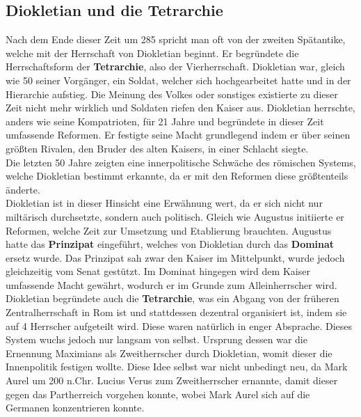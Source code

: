 \documentclass{article}
\begin{document}
	\subsection{Diokletian und die Tetrarchie}
	Nach dem Ende dieser Zeit um 285 spricht man oft von der zweiten Spätantike, welche mit der Herrschaft von Diokletian beginnt. Er begründete die Herrschaftsform der \textbf{Tetrarchie}, also der Vierherrschaft. Diokletian war, gleich wie 50 seiner Vorgänger, ein Soldat, welcher sich hochgearbeitet hatte und in der Hierarchie aufstieg. Die Meinung des Volkes oder sonstiges existierte zu dieser Zeit nicht mehr wirklich und Soldaten riefen den Kaiser aus. Diokletian herrschte, anders wie seine Kompatrioten, für 21 Jahre und begründete in dieser Zeit umfassende Reformen. Er festigte seine Macht grundlegend indem er über seinen größten Rivalen, den Bruder des alten Kaisers, in einer Schlacht siegte. \\
	Die letzten 50 Jahre zeigten eine innerpolitische Schwäche des römischen Systems, welche Diokletian bestimmt erkannte, da er mit den Reformen diese größtenteils änderte. \\
	Diokletian ist in dieser Hinsicht eine Erwähnung wert, da er sich nicht nur miltärisch durchsetzte, sondern auch politisch. Gleich wie Augustus initiierte er Reformen, welche Zeit zur Umsetzung und Etablierung brauchten. Augustus hatte das \textbf{Prinzipat} eingeführt, welches von Diokletian durch das \textbf{Dominat} ersetz wurde. Das Prinzipat sah zwar den Kaiser im Mittelpunkt, wurde jedoch gleichzeitig vom Senat gestützt. Im Dominat hingegen wird dem Kaiser umfassende Macht gewährt, wodurch er im Grunde zum Alleinherrscher wird. \\
	Diokletian begründete auch die \textbf{Tetrarchie}, was ein Abgang von der früheren Zentralherrschaft in Rom ist und stattdessen dezentral organisiert ist, indem sie auf 4 Herrscher aufgeteilt wird. Diese waren natürlich in enger Absprache. Dieses System wuchs jedoch nur langsam von selbst. Ursprung dessen war die Ernennung Maximians als Zweitherrscher durch Diokletian, womit dieser die Innenpolitik festigen wollte. Diese Idee selbst war nicht unbedingt neu, da Mark Aurel um 200 n.Chr. Lucius Verus zum Zweitherrscher ernannte, damit dieser gegen das Partherreich vorgehen konnte, wobei Mark Aurel sich auf die Germanen konzentrieren konnte. \\
\end{document}
